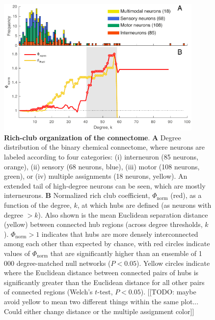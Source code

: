 \documentclass[10pt,letterpaper]{article}
\begin{document}
\begin{figure}[h]
   \centering
    \includegraphics[width=0.9\textwidth]{topology_rich.pdf}
 \caption{\textbf{Rich-club organization of the connectome}.
\textbf{A} Degree distribution of the binary chemical connectome, where neurons are labeled according to four categories:
(i) interneuron (85 neurons, orange),
(ii) sensory (68 neurons, blue),
(iii) motor (108 neurons, green), or
(iv) multiple assignments (18 neurons, yellow).
An extended tail of high-degree neurons can be seen, which are mostly interneurons.
\textbf{B}
Normalized rich club coefficient, $\Phi_\mathrm{norm}$ (red), as a function of the degree, $k$, at which hubs are defined (as neurons with degree $>k$).
Also shown is the mean Euclidean separation distance (yellow) between connected hub regions (across degree thresholds, $k$).
$\Phi_\mathrm{norm} > 1$ indicates that hubs are more densely interconnected among each other than expected by chance, with red circles indicate values of $\Phi_\mathrm{norm}$ that are significantly higher than an ensemble of 1\,000 degree-matched null networks ($P < 0.05$).
Yellow circles indicate where the Euclidean distance between connected pairs of hubs is significantly greater than the Euclidean distance for all other pairs of connected regions (Welch's $t$-test, $P < 0.05$).
[[TODO: maybe avoid yellow to mean two different things within the same plot... Could either change distance or the multiple assignment color]]
}
 \label{fig:topology_rich}
 \end{figure}
\end{document}
